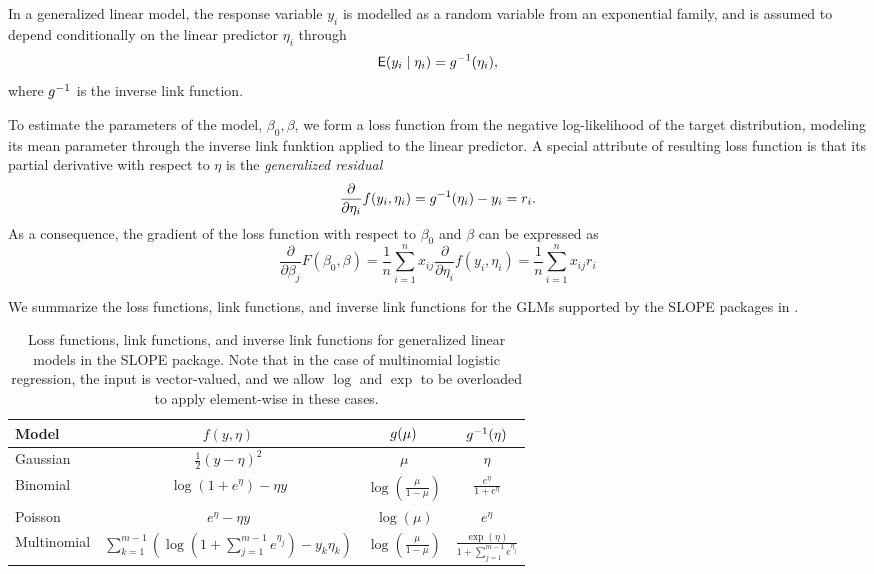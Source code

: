 \documentclass[article]{jss}
\let\Cref\crtCref
\begin{document}
In a generalized linear model, the response variable \(y_i\) is modelled
as a random variable from an exponential family, and is assumed to depend
conditionally on the linear predictor \(\eta_i\) through
\[
  \mathsf{E}(y_i \mid \eta_i) = g^{-1}(\eta_i),
\]
where \(g^{-1}\) is the inverse link function.

To estimate the parameters of the model, \(\beta_0, \beta\), we form a loss
function from the negative log-likelihood of the target distribution, modeling
its mean parameter through the inverse link funktion applied to the linear
predictor. A special attribute of resulting loss function is that its partial
derivative with respect to \(\eta\) is the
\emph{generalized residual}
\[
  \frac{\partial}{\partial \eta_i} f(y_i, \eta_i) = g^{-1}(\eta_i) - y_i = r_i.
\]
As a consequence, the gradient of the loss function with respect to \(\beta_0\)
and \(\beta\) can be expressed as
\[
  \frac{\partial}{\partial \beta_j} F(\beta_0,\beta)
  = \frac{1}{n} \sum_{i=1}^n x_{ij} \frac{\partial}{\partial \eta_i} f(y_i, \eta_i)
  = \frac{1}{n} \sum_{i=1}^n x_{ij} r_i
\]

We summarize the loss functions, link functions, and inverse link functions
for the GLMs supported by the SLOPE packages in \Cref{tab:glm}.

\begin{table}[t!]
  \centering
  \label{tab:glm}
  \begin{tabular}{lccc}
    \toprule
    Model       & \(f(y, \eta)\)                                                                                       & \(g(\mu)\)                            & \(g^{-1}(\eta)\)                                       \\
    \midrule
    Gaussian    & \(\frac{1}{2}(y - \eta)^2\)                                                                          & \(\mu\)                                   & \(\eta\)                                               \\
    \addlinespace
    Binomial    & \(\log(1 + e^\eta) - \eta y\)                                                                        & \(\log \left(\frac{\mu}{1 - \mu}\right)\) & \(\frac{e^\eta}{1 + e^\eta}\)                          \\
    \addlinespace
    Poisson     & \(e^\eta - \eta y\)                                                                                  & \(\log(\mu)\)                             & \(e^\eta\)                                             \\
    \addlinespace
    Multinomial & \(\sum_{k=1}^{m-1}\left( \log \left( 1 +  \sum_{j=1}^{m-1} e^{\eta_j}\right) - y_k \eta_k  \right)\) & \(\log\left(\frac{\mu}{1 - \mu}\right) \) & \(\frac{\exp(\eta)}{1 + \sum_{j=1}^{m-1} e^{\eta_j}}\) \\
    \bottomrule
  \end{tabular}
  \caption{Loss functions, link functions, and inverse link functions for
    generalized linear models in the SLOPE package. Note that in the case of
    multinomial logistic regression, the input is vector-valued, and we allow
    \(\log\) and \(\exp\) to be overloaded to apply element-wise in these cases.
  }
\end{table}
\end{document}
